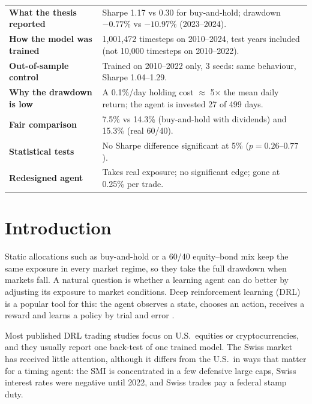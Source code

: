 \documentclass[11pt,a4paper]{article}
\begin{document}
\begin{keybox}
\small
\begin{tabularx}{\linewidth}{@{}p{4.6cm}X@{}}
\textbf{What the thesis reported} & Sharpe 1.17 vs 0.30 for buy-and-hold; drawdown $-0.77\%$ vs $-10.97\%$ (2023--2024). \\[2pt]
\textbf{How the model was trained} & 1,001,472 timesteps on 2010--2024, test years included (not 10,000 timesteps on 2010--2022). \\[2pt]
\textbf{Out-of-sample control} & Trained on 2010--2022 only, 3 seeds: same behaviour, Sharpe 1.04--1.29. \\[2pt]
\textbf{Why the drawdown is low} & A 0.1\%/day holding cost $\approx$ 5$\times$ the mean daily return; the agent is invested 27 of 499 days. \\[2pt]
\textbf{Fair comparison} & 7.5\% vs 14.3\% (buy-and-hold with dividends) and 15.3\% (real 60/40). \\[2pt]
\textbf{Statistical tests} & No Sharpe difference significant at 5\% ($p = 0.26$--$0.77$). \\[2pt]
\textbf{Redesigned agent} & Takes real exposure; no significant edge; gone at 0.25\% per trade. \\
\end{tabularx}
\end{keybox}

\newpage
\tableofcontents
\newpage

\section{Introduction}

Static allocations such as buy-and-hold or a 60/40 equity--bond mix keep the same exposure in every market regime, so they take the full drawdown when markets fall. A natural question is whether a learning agent can do better by adjusting its exposure to market conditions. Deep reinforcement learning (DRL) is a popular tool for this: the agent observes a state, chooses an action, receives a reward and learns a policy by trial and error \citep{jiang2017,xiong2018,yang2020}.

Most published DRL trading studies focus on U.S.\ equities or cryptocurrencies, and they usually report one back-test of one trained model. The Swiss market has received little attention, although it differs from the U.S.\ in ways that matter for a timing agent: the SMI is concentrated in a few defensive large caps, Swiss interest rates were negative until 2022, and Swiss trades pay a federal stamp duty.
\end{document}
